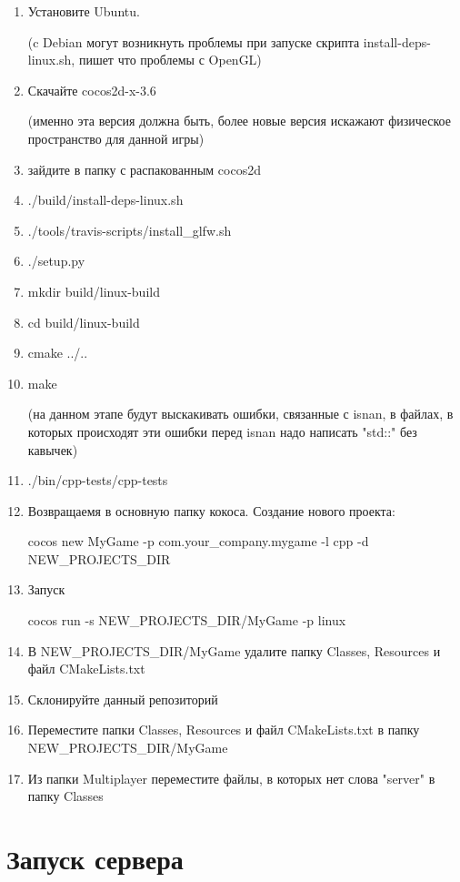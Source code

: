\begin{enumerate}
\item Установите Ubuntu. 

(c Debian могут возникнуть проблемы при запуске скрипта install-deps-linux.sh, пишет что проблемы с OpenGL)

\item Скачайте cocos2d-x-3.6 

(именно эта версия должна быть, более новые версия искажают физическое пространство для данной игры) 

\item зайдите в папку с распакованным cocos2d 
\item  ./build/install-deps-linux.sh
\item  ./tools/travis-scripts/install\_glfw.sh
\item  ./setup.py
\item  mkdir build/linux-build 
\item  cd build/linux-build 
\item  cmake ../.. 
\item  make 

(на данном этапе будут выскакивать ошибки, связанные с isnan, в файлах, в которых происходят эти ошибки перед isnan надо написать "std::" без кавычек) 

\item  ./bin/cpp-tests/cpp-tests 

\item  Возвращаемя в основную папку кокоса. Создание нового проекта:

cocos new MyGame -p com.your\_company.mygame -l cpp -d NEW\_PROJECTS\_DIR 

\item  Запуск 

cocos run -s NEW\_PROJECTS\_DIR/MyGame -p linux 

\item В NEW\_PROJECTS\_DIR/MyGame удалите папку Classes, Resources и файл CMakeLists.txt 
\item Склонируйте данный репозиторий 
\item Переместите папки Classes, Resources и файл CMakeLists.txt в папку NEW\_PROJECTS\_DIR/MyGame 
\item Из папки Multiplayer переместите файлы, в которых нет слова "server" в папку Classes
\end{enumerate}

\section{Запуск сервера}

